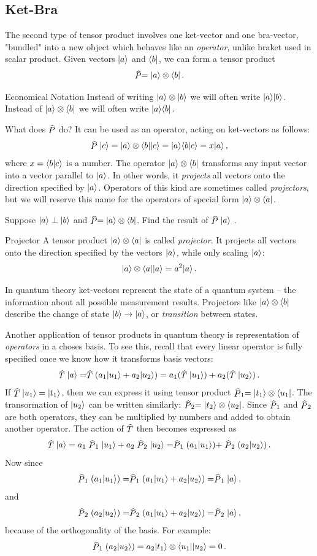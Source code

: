 \subsection{Ket-Bra}
The second type of tensor product involves one ket-vector and one bra-vector, "bundled" into a new object which behaves like an \emph{operator}, unlike braket used in scalar product. Given vectors $|{a}\rangle$ and $\langle{b}|$, we can form a tensor product
\[
\op{P}=\ket{a}\otimes\bra{b}\,.
\] 
\begin{mybio}{Economical Notation}
	Instead of writing $|{a}\rangle\otimes|{b}\rangle$ we will often write $|{a}\rangle|{b}\rangle$. Instead of $|{a}\rangle\otimes\langle{b}|$ we will often write $|{a}\rangle\langle{b}|$.
\end{mybio}
What does $\op{P}$ do? It can be used as an operator, acting on ket-vectors as follows:
\[
\op{P}\ket{c}=\ket{a}\otimes\bra{b}\ket{c}=\ket{a}\braket{b}{c}=x\ket{a}\,,
\]
where $x=\langle{b}|{c\rangle}$ is a number. The operator $|{a}\rangle\otimes\langle{b}|$ transforms any input vector into a vector parallel to $|{a}\rangle$. In other words, it \emph{projects} all vectors onto the direction specified by $|{a}\rangle$. Operators of this kind are sometimes called \emph{projectors}, but we will reserve this name for the operators of special form $|{a}\rangle\otimes\langle{a}|$.
\begin{exercise}
	Suppose $|{a}\rangle\perp |{b}\rangle$ and $\op{P}=\ket{a}\otimes\bra{b}$. Find the result of $\op{P}\ket{a}$ .
\end{exercise}
\begin{mydef}{Projector}
	A tensor product $|{a}\rangle\otimes\langle{a}|$ is called \emph{projector}. It projects all vectors onto the direction specified by the vectors $|{a}\rangle$, while only scaling $|{a}\rangle$:
	\[
	|{a}\rangle\otimes\langle{a}||{a}\rangle=a^2|{a}\rangle\,.
	\]
\end{mydef}

In quantum theory ket-vectors represent the state of a quantum system -- the information about all possible measurement results. Projectors like $|{a}\rangle\otimes\langle{b}|$ describe the change of state $|{b}\rangle\to|{a}\rangle$, or \emph{transition} between states. 

Another application of tensor products in quantum theory is representation of \emph{operators} in a choses basis. To see this, recall that every linear operator is fully specified once we know how it transforms basis vectors:
\[
\op{T}\ket{a}=\op{T}(a_1\ket{u_1}+a_2\ket{u_2})=a_1(\op{T}\ket{u_1})+a_2(\op{T}\ket{u_2})\,.
\]
If $\op{T}\ket{u_1}=\ket{t_1}$, then we can express it using tensor product $\op{P}_1=\ket{t_1}\otimes\bra{u_1}$. The transormation of $|{u_2}\rangle$ can be written similarly: $\op{P}_2=\ket{t_2}\otimes\bra{u_2}$. Since $\op{P}_1$ and $\op{P}_2$ are both operators, they can be multiplied by numbers and added to obtain another operator. The action of $\op{T}$ then becomes expressed as
\[
\op{T}\ket{a}=a_1\op{P}_1\ket{u_1}+a_2\op{P}_2\ket{u_2}=\op{P}_1(a_1\ket{u_1})+\op{P}_2(a_2\ket{u_2})\,.
\] 
Now since 
\[
\op{P}_1(a_1\ket{u_1})=\op{P}_1(a_1\ket{u_1}+a_2\ket{u_2})=\op{P}_1 \ket{a}\,,
\]
and
\[
\op{P}_2(a_2\ket{u_2})=\op{P}_2(a_1\ket{u_1}+a_2\ket{u_2})=\op{P}_2 \ket{a}\,,
\]
because of the orthogonality of the basis. For example:
\[
	\op{P}_1(a_2\ket{u_2})=a_2\ket{t_1}\otimes\bra{u_1}\ket{u_2}=0\,.
\]


